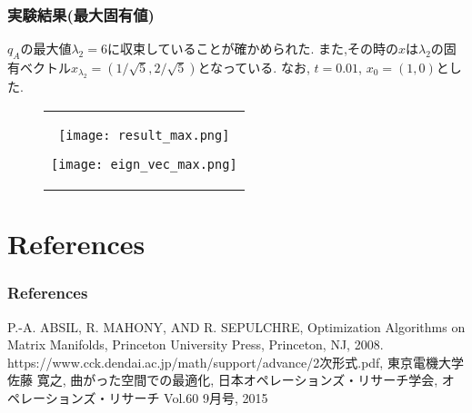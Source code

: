 \documentclass[dvipdfmx,11pt]{beamer}		%
\begin{document}
    \begin{frame}
        \frametitle{実験結果(最大固有値)}
        $q_{A}$の最大値$\lambda_2 = 6$に収束していることが確かめられた.
        また,その時の$x$は$\lambda_2$の固有ベクトル$x_{\lambda_2} = (1/\sqrt{5}, 2/\sqrt{5})$となっている.
        なお, $t = 0.01$, $x_{0} = (1, 0)$とした. 
        \begin{figure}[b]
            \begin{tabular}{c}
                \begin{minipage}{0.55\hsize}
                    \centering
                    \texttt{[image: result\_max.png]}
                \end{minipage}
                \begin{minipage}{0.45\hsize}
                    \centering
                    \texttt{[image: eign\_vec\_max.png]}
                \end{minipage}
            \end{tabular}   
        \end{figure}  
    \end{frame}
\section*{References}
    \begin{frame}\frametitle{References}
        \begin{thebibliography}{9}
            \beamertemplatetextbibitems
            \bibitem{} P.-A. ABSIL, R. MAHONY, AND R. SEPULCHRE, Optimization Algorithms on Matrix Manifolds, 
                       Princeton University Press, Princeton, NJ, 2008.
             https://www.cck.dendai.ac.jp/math/support/advance/2次形式.pdf, 東京電機大学
             佐藤 寛之, 曲がった空間での最適化, 日本オペレーションズ・リサーチ学会, オペレーションズ・リサーチ Vol.60 9月号, 2015
	    \end{thebibliography}
    \end{frame}
\end{document}
